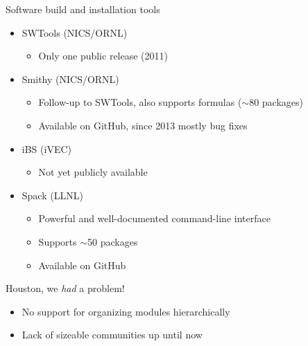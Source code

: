 \documentclass[10pt,xcolor={usenames,dvipsnames}]{beamer}
\begin{document}
\begin{frame}{Software build and installation tools}
\begin{itemize}
    \item
        SWTools (NICS/ORNL)
        \begin{itemize}
            \item
                Only one public release (2011)
        \end{itemize}
    \item
        Smithy (NICS/ORNL)
        \begin{itemize}
            \item
                Follow-up to SWTools, also supports formulas ($\sim$80 packages)
            \item
                Available on GitHub, since 2013 mostly bug fixes
        \end{itemize}
    \item
        iBS (iVEC)
        \begin{itemize}
            \item
                Not yet publicly available
        \end{itemize}
    \item
        Spack (LLNL)
        \begin{itemize}
            \item
                Powerful and well-documented command-line interface
            \item
                Supports $\sim$50 packages
            \item
                Available on GitHub
        \end{itemize}
\end{itemize}

\begin{center}
    \begin{minipage}{0.9\textwidth}
        \begin{alertblock}{\small Houston, we \emph{had} a problem!}
            \footnotesize
            \begin{itemize}
            \item No support for organizing modules hierarchically
            \item Lack of sizeable communities up until now
            \end{itemize}
        \end{alertblock}
    \end{minipage}
\end{center}

\end{frame}
\end{document}
